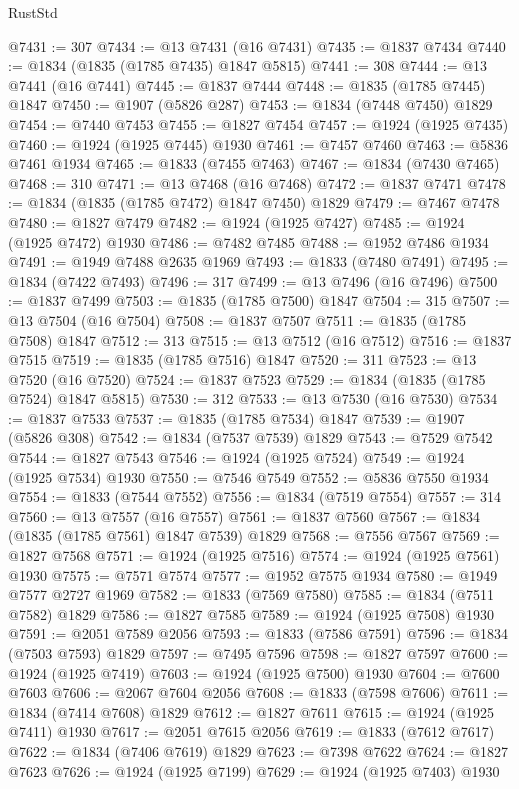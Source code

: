 \begin{lexlean}{RustStd}
\begin{coremodule}
@7431 := 307
@7434 := @13 @7431 (@16 @7431)
@7435 := @1837 @7434
@7440 := @1834 (@1835 (@1785 @7435) @1847 @5815)
@7441 := 308
@7444 := @13 @7441 (@16 @7441)
@7445 := @1837 @7444
@7448 := @1835 (@1785 @7445) @1847
@7450 := @1907 (@5826 @287)
@7453 := @1834 (@7448 @7450) @1829
@7454 := @7440 @7453
@7455 := @1827 @7454
@7457 := @1924 (@1925 @7435)
@7460 := @1924 (@1925 @7445) @1930
@7461 := @7457 @7460
@7463 := @5836 @7461 @1934
@7465 := @1833 (@7455 @7463)
@7467 := @1834 (@7430 @7465)
@7468 := 310
@7471 := @13 @7468 (@16 @7468)
@7472 := @1837 @7471
@7478 := @1834 (@1835 (@1785 @7472) @1847 @7450) @1829
@7479 := @7467 @7478
@7480 := @1827 @7479
@7482 := @1924 (@1925 @7427)
@7485 := @1924 (@1925 @7472) @1930
@7486 := @7482 @7485
@7488 := @1952 @7486 @1934
@7491 := @1949 @7488 @2635 @1969
@7493 := @1833 (@7480 @7491)
@7495 := @1834 (@7422 @7493)
@7496 := 317
@7499 := @13 @7496 (@16 @7496)
@7500 := @1837 @7499
@7503 := @1835 (@1785 @7500) @1847
@7504 := 315
@7507 := @13 @7504 (@16 @7504)
@7508 := @1837 @7507
@7511 := @1835 (@1785 @7508) @1847
@7512 := 313
@7515 := @13 @7512 (@16 @7512)
@7516 := @1837 @7515
@7519 := @1835 (@1785 @7516) @1847
@7520 := 311
@7523 := @13 @7520 (@16 @7520)
@7524 := @1837 @7523
@7529 := @1834 (@1835 (@1785 @7524) @1847 @5815)
@7530 := 312
@7533 := @13 @7530 (@16 @7530)
@7534 := @1837 @7533
@7537 := @1835 (@1785 @7534) @1847
@7539 := @1907 (@5826 @308)
@7542 := @1834 (@7537 @7539) @1829
@7543 := @7529 @7542
@7544 := @1827 @7543
@7546 := @1924 (@1925 @7524)
@7549 := @1924 (@1925 @7534) @1930
@7550 := @7546 @7549
@7552 := @5836 @7550 @1934
@7554 := @1833 (@7544 @7552)
@7556 := @1834 (@7519 @7554)
@7557 := 314
@7560 := @13 @7557 (@16 @7557)
@7561 := @1837 @7560
@7567 := @1834 (@1835 (@1785 @7561) @1847 @7539) @1829
@7568 := @7556 @7567
@7569 := @1827 @7568
@7571 := @1924 (@1925 @7516)
@7574 := @1924 (@1925 @7561) @1930
@7575 := @7571 @7574
@7577 := @1952 @7575 @1934
@7580 := @1949 @7577 @2727 @1969
@7582 := @1833 (@7569 @7580)
@7585 := @1834 (@7511 @7582) @1829
@7586 := @1827 @7585
@7589 := @1924 (@1925 @7508) @1930
@7591 := @2051 @7589 @2056
@7593 := @1833 (@7586 @7591)
@7596 := @1834 (@7503 @7593) @1829
@7597 := @7495 @7596
@7598 := @1827 @7597
@7600 := @1924 (@1925 @7419)
@7603 := @1924 (@1925 @7500) @1930
@7604 := @7600 @7603
@7606 := @2067 @7604 @2056
@7608 := @1833 (@7598 @7606)
@7611 := @1834 (@7414 @7608) @1829
@7612 := @1827 @7611
@7615 := @1924 (@1925 @7411) @1930
@7617 := @2051 @7615 @2056
@7619 := @1833 (@7612 @7617)
@7622 := @1834 (@7406 @7619) @1829
@7623 := @7398 @7622
@7624 := @1827 @7623
@7626 := @1924 (@1925 @7199)
@7629 := @1924 (@1925 @7403) @1930

\end{coremodule}
\end{lexlean}
